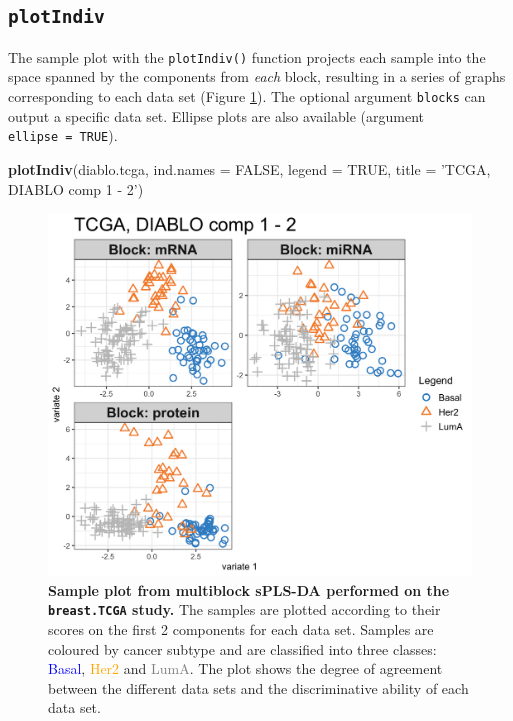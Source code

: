 \documentclass[]{book}
\newenvironment{Shaded}{\begin{snugshade}}{\end{snugshade}}
\newcommand{\DataTypeTok}[1]{\textcolor[rgb]{0.13,0.29,0.53}{#1}}
\newcommand{\KeywordTok}[1]{\textcolor[rgb]{0.13,0.29,0.53}{\textbf{#1}}}
\newcommand{\NormalTok}[1]{#1}
\newcommand{\OtherTok}[1]{\textcolor[rgb]{0.56,0.35,0.01}{#1}}
\newcommand{\StringTok}[1]{\textcolor[rgb]{0.31,0.60,0.02}{#1}}
\begin{document}
\hypertarget{plotindiv}{%
\subsection{\texorpdfstring{\texttt{plotIndiv}}{plotIndiv}}\label{plotindiv}}

The sample plot with the \texttt{plotIndiv()} function projects each sample into the space spanned by the components from \emph{each} block, resulting in a series of graphs corresponding to each data set (Figure \ref{fig:diablo-plotindiv}). The optional argument \texttt{blocks} can output a specific data set. Ellipse plots are also available (argument \texttt{ellipse\ =\ TRUE}).

\begin{Shaded}
\begin{Highlighting}[]
\KeywordTok{plotIndiv}\NormalTok{(diablo.tcga, }\DataTypeTok{ind.names =} \OtherTok{FALSE}\NormalTok{, }\DataTypeTok{legend =} \OtherTok{TRUE}\NormalTok{, }
          \DataTypeTok{title =} \StringTok{'TCGA, DIABLO comp 1 - 2'}\NormalTok{)}
\end{Highlighting}
\end{Shaded}

\begin{figure}

{\centering \includegraphics[width=0.5\linewidth]{Figures/DIABLO/diablo-plotindiv-1} 

}

\caption{\textbf{Sample plot from multiblock sPLS-DA performed on the \texttt{breast.TCGA} study.} The samples are plotted according to their scores on the first 2 components for each data set. Samples are coloured by cancer subtype and are classified into three classes: \textcolor{blue}{Basal}, \textcolor{orange}{Her2} and \textcolor{grey}{LumA}. The plot shows the degree of agreement between the different data sets and the discriminative ability of each data set.}\label{fig:diablo-plotindiv}
\end{figure}
\end{document}
